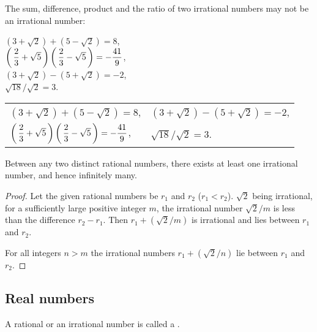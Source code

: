 \documentclass[11pt]{amsbook}
\begin{document}
\begin{rem}
	The sum, difference, product and the ratio of two irrational numbers may not be an irrational number: \\
{\color{blue} %
		\begin{multicols}{2}
		$(3 + \sqrt{2}) + (5 - \sqrt{2}) = 8$,\\
		$ \left( \, \dfrac{2}{3} + \sqrt{5} \, \right) 
		 \left( \, \dfrac{2}{3} - \sqrt{5} \, \right)  
		= -\dfrac{41}{9}$,\\
	\columnbreak
		$(3 + \sqrt{2}) - (5 + \sqrt{2}) = -2$,\\
		$\sqrt{18} / \sqrt{2} = 3$.
	\end{multicols}
} %

	\begin{tabular}{ll}
		$(3 + \sqrt{2}) + (5 - \sqrt{2}) = 8$, 
		& $(3 + \sqrt{2}) - (5 + \sqrt{2}) = -2$, \\
		$ \left( \, \dfrac{2}{3} + \sqrt{5} \, \right) 
		 \left( \, \dfrac{2}{3} - \sqrt{5} \, \right)  
		= -\dfrac{41}{9}$, \quad \quad
		& $\sqrt{18} / \sqrt{2} = 3$.
	\end{tabular}
\end{rem}

\begin{cor}
	Between any two distinct rational numbers, 
	there exists at least one irrational number, 
	and hence infinitely many.

	\begin{proof}		
		Let the given rational numbers be $r_{1}$ and $r_{2}$ 
		($r_{1} < r_{2}$).
		$\sqrt{2}$ being irrational, 
		for a sufficiently large positive integer $m$, 
		the irrational number $\sqrt{2} / m$ is less than 
		the difference $r_2 - r_{1}$. 
		Then $r_{1} + (\sqrt{2} / m)$ is irrational and 
		lies between $r_{1}$ and $r_{2}$.
		
		For all integers $n > m$ the irrational numbers 
		$r_{1} + (\sqrt{2}/n)$ lie between $r_{1}$ and $r_{2}$. 
	\end{proof}
\end{cor}




\subsection{Real numbers}
\label{subsec:RealNumbers}

A rational or an irrational number is called a 
. 
\end{document}
